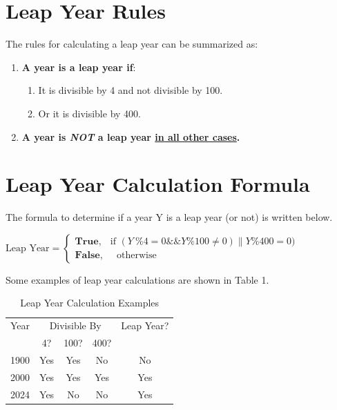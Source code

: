 \documentclass[12pt]{article}
\begin{document}
\section{Leap Year Rules}
 The rules for calculating a leap year can be summarized as:

    \begin{enumerate}
        \item \textbf{A year is a leap year if}:
        \begin{enumerate}
            \item It is divisible by 4 and not divisible by 100.
            \item Or it is divisible by 400.
        \end{enumerate}
        \item \textbf{A year is \textit{NOT} a leap year \underline{in all other cases}.}
    \end{enumerate}

    

\section{Leap Year Calculation Formula}
 The formula to determine if a year Y is a leap year (or not) is written below.

 $ \text{Leap Year} = 
\begin{cases}
\textbf{True,} & \text{if } (Y\: \% 4 = 0 \&\& Y \% 100 \neq 0 )\| Y \% 400 = 0 ) \\
\textbf{False,}  & \text{ } \text{otherwise}
\end{cases}$


Some examples of leap year calculations are shown in Table 1.
    \begin{table}[h]
    \centering
    \begin{tabular}{|c|c|c|c|c|}
        \hline
        Year & \multicolumn{3}{c|}{Divisible By} & Leap Year? \\
        \cline{2-4}
        & 4? & 100? & 400? & \\
        \hline
        1900 & Yes & Yes & No & No \\
        \hline
        2000 & Yes & Yes & Yes & Yes \\
        \hline
        2024 & Yes & No & No & Yes \\
        \hline
    \end{tabular}
    \caption{Leap Year Calculation Examples}
    \label{tab:leap-year-examples}
    \end{table}
\end{document}
